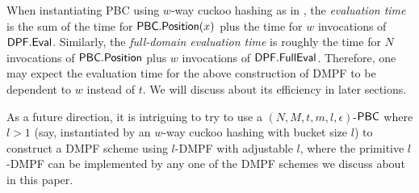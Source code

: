 When instantiating PBC using $w$-way cuckoo hashing as in , the \emph{evaluation time} is the sum of the time for ${\sf PBC}.{\sf Position}(x)$ plus the time for $w$ invocations of ${\sf DPF}.{\sf Eval}$. Similarly, the \emph{full-domain evaluation time} is roughly the time for $N$ invocations of ${\sf PBC}.{\sf Position}$ plus $w$ invocations of ${\sf DPF}.{\sf FullEval}$. Therefore, one may expect the evaluation time for the above construction of DMPF to be dependent to $w$ instead of $t$. We will discuss about its efficiency in later sections. 
\begin{remark}
  As a future direction, it is intriguing to try to use a $(N,M,t,m,l,\epsilon)$-${\sf PBC}$ where $l>1$ (say, instantiated by an $w$-way cuckoo hashing with bucket size $l$) to construct a DMPF scheme using $l$-DMPF with adjustable $l$, where the primitive $l$-DMPF can be implemented by any one of the DMPF schemes we discuss about in this paper. 
\end{remark}

